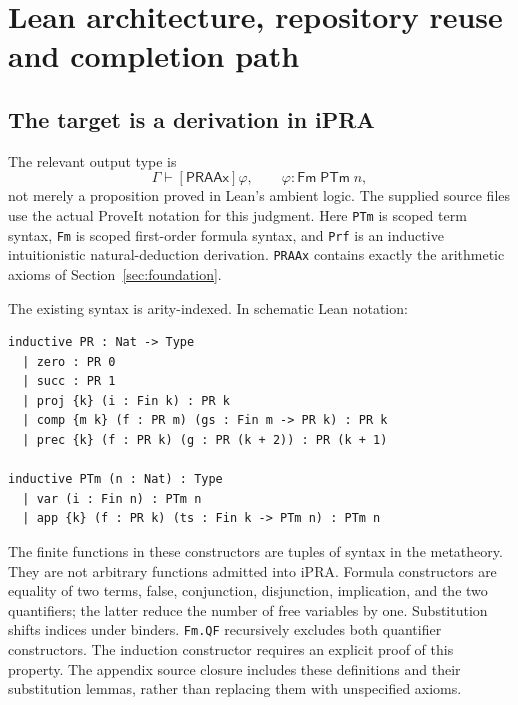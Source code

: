 \section{Lean architecture, repository reuse and completion path}\label{sec:lean}

\subsection{The target is a derivation in iPRA}
The relevant output type is
\[
            \Gamma\vdash[\mathsf{PRAAx}]\varphi,
       \qquad \varphi:\mathsf{Fm}\;\mathsf{PTm}\;n,
\]
not merely a proposition proved in Lean's ambient logic. The supplied
source files use the actual ProveIt notation for this judgment.
Here \texttt{PTm} is scoped term syntax, \texttt{Fm} is scoped
first-order formula syntax, and \texttt{Prf} is an inductive
intuitionistic natural-deduction derivation. \texttt{PRAAx} contains
exactly the arithmetic axioms of Section~\ref{sec:foundation}.

The existing syntax is arity-indexed. In schematic Lean notation:
\begin{verbatim}
inductive PR : Nat -> Type
  | zero : PR 0
  | succ : PR 1
  | proj {k} (i : Fin k) : PR k
  | comp {m k} (f : PR m) (gs : Fin m -> PR k) : PR k
  | prec {k} (f : PR k) (g : PR (k + 2)) : PR (k + 1)

inductive PTm (n : Nat) : Type
  | var (i : Fin n) : PTm n
  | app {k} (f : PR k) (ts : Fin k -> PTm n) : PTm n
\end{verbatim}
The finite functions in these constructors are tuples of syntax in the
metatheory. They are not arbitrary functions admitted into iPRA.
Formula constructors are equality of two terms, false, conjunction,
disjunction, implication, and the two quantifiers; the latter reduce
the number of free variables by one. Substitution shifts indices under
binders. \texttt{Fm.QF} recursively excludes both quantifier constructors.
The induction constructor requires an explicit proof of this property.
The appendix source closure includes these definitions and their
substitution lemmas, rather than replacing them with unspecified axioms.

